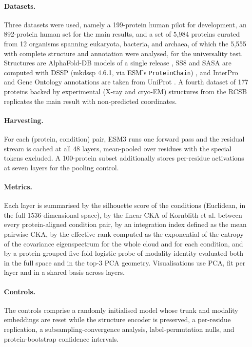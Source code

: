 \documentclass[11pt]{article}
\begin{document}
\paragraph{Datasets.} Three datasets were used, namely a 199-protein human pilot
for development, an 892-protein human set for the main results, and a set of 5,984
proteins curated from 12 organisms spanning eukaryota, bacteria, and archaea, of which
the 5,555 with complete structure and annotation were analysed, for the universality
test. Structures are AlphaFold-DB models of a single release
\cite{jumper2021,varadi2022}, SS8 and SASA are computed with DSSP (mkdssp 4.6.1, via
ESM's \texttt{ProteinChain}) \cite{kabsch1983}, and InterPro and Gene Ontology
annotations are taken from UniProt \cite{uniprot2023,paysanlafosse2023}. A
fourth dataset of 177 proteins backed by experimental (X-ray and cryo-EM) structures
from the RCSB replicates the main result with non-predicted coordinates.

\paragraph{Harvesting.} For each (protein, condition) pair, ESM3 runs one forward
pass and the residual stream is cached at all 48 layers, mean-pooled over residues
with the special tokens excluded. A 100-protein subset additionally stores
per-residue activations at seven layers for the pooling control.

\paragraph{Metrics.} Each layer is summarised by the silhouette score
\cite{rousseeuw1987} of the conditions (Euclidean, in the full 1536-dimensional
space), by the linear CKA of Kornblith et al. \cite{kornblith2019} between every
protein-aligned condition pair, by an integration index defined as the mean pairwise
CKA, by the effective rank \cite{roy2007} computed as the exponential of the entropy
of the covariance eigenspectrum for the whole cloud and for each condition, and by a
protein-grouped five-fold logistic probe of modality identity evaluated both in the
full space and in the top-3 PCA geometry.
Visualisations use PCA, fit per layer and in a shared basis across layers.

\paragraph{Controls.} The controls comprise a randomly initialised model whose
trunk and modality embeddings are reset while the structure encoder is preserved, a
per-residue replication, a subsampling-convergence analysis, label-permutation
nulls, and protein-bootstrap confidence intervals.
\end{document}
